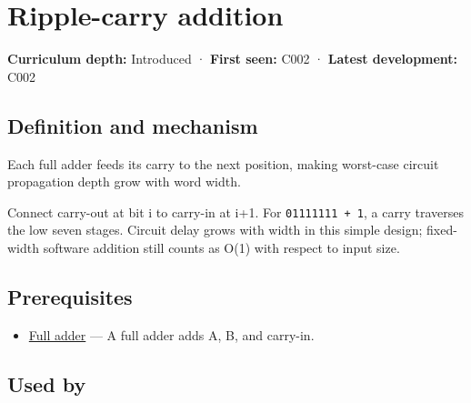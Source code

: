 \hypertarget{appendix-17917d9fdbe3}{}\label{referencestart:appendix-17917d9fdbe3}
\section{Ripple-carry addition}\label{appendix-17917d9fdbe3-ripple-carry-addition}

\hypertarget{appendix-17917d9fdbe3-ripple-carry-addition}{}

\textbf{Curriculum depth:} Introduced · \textbf{First seen:} C002 · \textbf{Latest development:} C002

\begin{allmightroledefinition}

\subsection{Definition and mechanism}\label{appendix-17917d9fdbe3-definition-and-mechanism}

\hypertarget{appendix-17917d9fdbe3-definition-and-mechanism}{}

Each full adder feeds its carry to the next position, making worst-case circuit propagation depth grow with word width.

\end{allmightroledefinition}

Connect carry-out at bit i to carry-in at i+1. For \texttt{01111111\ +\ 1}, a carry traverses the low seven stages. Circuit delay grows with width in this simple design; fixed-width software addition still counts as O(1) with respect to input size.

\subsection{Prerequisites}\label{appendix-17917d9fdbe3-prerequisites}

\hypertarget{appendix-17917d9fdbe3-prerequisites}{}

\begin{itemize}
\tightlist
\item
  \hyperref[appendix-d1a5b1e520c2]{Full adder} --- A full adder adds A, B, and carry-in.
\end{itemize}

\subsection{Used by}\label{appendix-17917d9fdbe3-used-by}

